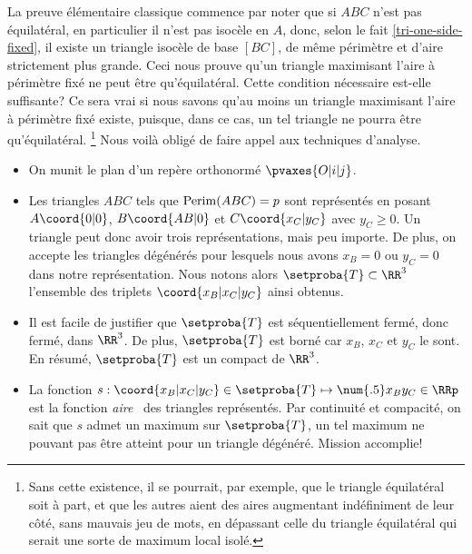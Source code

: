\begin{remark} \label{tri-topo-comp}
	La preuve élémentaire classique commence par noter que si $ABC$ n'est pas équilatéral, en particulier il n'est pas isocèle en $A$, donc, selon le fait \ref{tri-one-side-fixed}, il existe un triangle isocèle de base $[BC]$, de même périmètre et d'aire strictement plus grande.
	Ceci nous prouve qu'un triangle maximisant l'aire à périmètre fixé ne peut être qu'équilatéral. 
	Cette condition nécessaire est-elle suffisante? Ce sera vrai si nous savons qu'au moins un triangle maximisant l'aire à périmètre fixé existe, puisque, dans ce cas, un tel triangle ne pourra être qu'équilatéral.%
	\footnote{
		Sans cette existence, il se pourrait, par exemple, que le triangle équilatéral soit à part, et que les autres aient des aires augmentant indéfiniment de leur côté, sans mauvais jeu de mots, en dépassant celle du triangle équilatéral qui serait une sorte de maximum local isolé.
	}
	Nous voilà obligé de faire appel aux techniques d'analyse.
	\begin{itemize}
		\item On munit le plan d'un repère orthonormé $\pvaxes{O | i | j}$. 

		\item Les triangles $ABC$ tels que $\mathrm{Perim}(ABC) = p$ sont représentés en posant $A\coord{0 | 0}$, $B\coord{AB | 0}$ et $C\coord{x_C | y_C}$ avec $y_C \geq 0$. Un triangle peut donc avoir trois représentations, mais peu importe.
		De plus, on accepte les triangles dégénérés pour lesquels nous avons $x_B = 0$ ou $y_C = 0$ dans notre représentation.
		Nous notons alors $\setproba{T} \subset \RR^3$ l'ensemble des triplets $\coord{x_B | x_C | y_C}$ ainsi obtenus.

		\item Il est facile de justifier que $\setproba{T}$ est séquentiellement fermé, donc fermé, dans $\RR^3$.
		De plus, $\setproba{T}$ est borné car $x_B$, $x_C$ et $y_C$ le sont.
		En résumé, $\setproba{T}$ est un compact de $\RR^3$.

		\item La fonction $s: \coord{x_B | x_C | y_C} \in \setproba{T} \mapsto \num{.5} x_B y_C \in \RRp$ est la fonction \og \emph{aire} \fg\ des triangles représentés.
		Par continuité et compacité, on sait que $s$ admet un maximum sur $\setproba{T}$, un tel maximum ne pouvant pas être atteint pour un triangle dégénéré. Mission accomplie!
	\end{itemize}
\end{remark}


